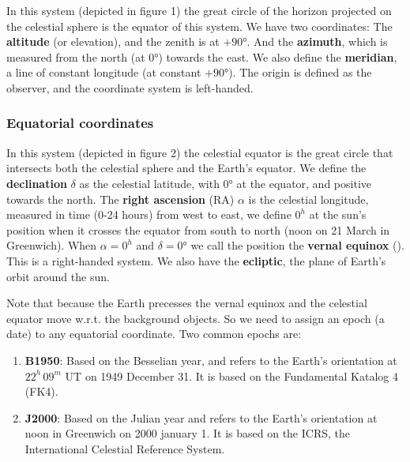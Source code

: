 \documentclass[a4paper]{article}
\begin{document}
In this system (depicted in figure 1) the great circle of the horizon projected on the celestial sphere is the equator of this system. We have two coordinates: The \textbf{altitude} (or elevation), and the zenith is at $+90\si{\degree}$. And the \textbf{azimuth}, which is measured from the north (at $0\si{\degree}$) towards the east. We also define the \textbf{meridian}, a line of constant longitude (at constant $+90\si{\degree}$). The origin is defined as the observer, and the coordinate system is left-handed.

\subsubsection*{Equatorial coordinates}

In this system (depicted in figure 2) the celestial equator is the great circle that intersects both the celestial sphere and the Earth's equator. We define the \textbf{declination} $\delta$ as the celestial latitude, with $0\si{\degree}$ at the equator, and positive towards the north. The \textbf{right ascension} (RA) $\alpha$ is the celestial longitude, measured in time (0-24 hours) from west to east, we define $0^h$ at the sun's position when it crosses the equator from south to north (noon on 21 March in Greenwich). When $\alpha=0^h$ and $\delta=0\si{\degree}$ we call the position the \textbf{vernal equinox} (\vernal). This is a right-handed system. We also have the \textbf{ecliptic}, the plane of Earth's orbit around the sun.

\bigskip 

Note that because the Earth precesses the vernal equinox and the celestial equator move w.r.t. the background objects. So we need to assign an epoch (a date) to any equatorial coordinate. Two common epochs are:

\begin{enumerate}
    \item \textbf{B1950}: Based on the Besselian year, and refers to the Earth's orientation at $22^h\,09^m$ UT on 1949 December 31. It is based on the Fundamental Katalog 4 (FK4).
    \item \textbf{J2000}: Based on the Julian year and refers to the Earth's orientation at noon in Greenwich on 2000 january 1. It is based on the ICRS, the International Celestial Reference System.
\end{enumerate}
\end{document}
